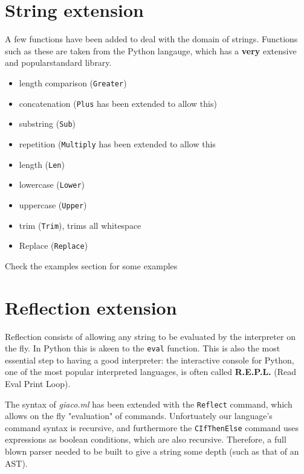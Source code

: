 \documentclass[11pt]{report}
\begin{document}
\part{String extension}
\label{sec:org555c7cd}
A few functions have been added to deal with the domain of strings.
Functions such as these are taken from the Python langauge, which has a \textbf{very} extensive and popularstandard library.
\begin{itemize}
\item length comparison (\texttt{Greater})
\item concatenation (\texttt{Plus} has been extended to allow this)
\item substring (\texttt{Sub})
\item repetition (\texttt{Multiply} has been extended to allow this
\item length (\texttt{Len})
\item lowercase (\texttt{Lower})
\item uppercase (\texttt{Upper})
\item trim (\texttt{Trim}), trims all whitespace
\item Replace (\texttt{Replace})
\end{itemize}

Check the examples section for some examples
\part{Reflection extension}
\label{sec:orgcd5fafe}
Reflection consists of allowing any string to be evaluated by the interpreter on the fly. In Python this is akeen to the \texttt{eval} function.
This is also the most essential step to having a good interpreter: the interactive console for Python,
 one of the most popular interpreted languages, is often called \textbf{R.E.P.L.} (Read Eval Print Loop).

The syntax of \emph{giaco.ml} has been extended with the \texttt{Reflect} command, which allows on the fly "evaluation" of commands.
Unfortuately our language's command syntax is recursive, and furthermore the \texttt{CIfThenElse} command
uses expressions as boolean conditions, which are also recursive.
Therefore, a full blown parser needed to be built to give a string some depth (such as that of an AST).
\end{document}
